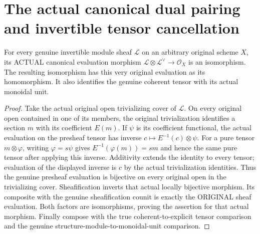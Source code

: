\section{The actual canonical dual pairing and invertible tensor cancellation}

\begin{lemma}
\label{lem:cartier-actual-canonical-dual-evaluation-isomorphism}
\leanok
For every genuine invertible module sheaf $\mathcal L$ on an arbitrary
original scheme $X$, its ACTUAL canonical evaluation morphism
$\mathcal L\otimes\mathcal L^\vee\to\mathcal O_X$ is an isomorphism.
The resulting isomorphism has this very original evaluation as its
homomorphism. It also identifies the genuine coherent tensor with
its actual monoidal unit.
\end{lemma}
\begin{proof}
Take the actual original open trivializing cover of $\mathcal L$.
On every original open contained in one of its members, the original
trivialization identifies a section $m$ with its coefficient $E(m)$.
If $\psi$ is its coefficient functional, the actual evaluation on the
presheaf tensor has inverse $c\mapsto E^{-1}(c)\otimes\psi$.
For a pure tensor $m\otimes\varphi$, writing
$\varphi=s\psi$ gives $E^{-1}(\varphi(m))=sm$ and hence the same
pure tensor after applying this inverse. Additivity extends the
identity to every tensor; evaluation of the displayed inverse is
$c$ by the actual trivialization identities. Thus the genuine
presheaf evaluation is bijective on every original open in the
trivializing cover. Sheafification inverts that actual locally
bijective morphism. Its composite with the genuine sheafification
counit is exactly the ORIGINAL sheaf evaluation. Both factors are
isomorphisms, proving the assertion for that actual morphism.
Finally compose with the true coherent-to-explicit tensor comparison
and the genuine structure-module-to-monoidal-unit comparison.
\end{proof}


